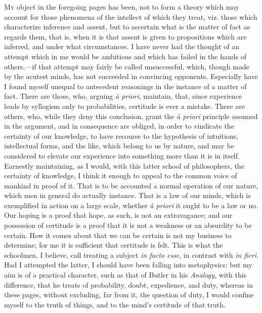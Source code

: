 M\textsc{y} object in the foregoing pages has been, not to form a
theory which may account for those phenomena of the intellect of which
they treat, viz. those which characterize inference and assent, but to
ascertain what is the matter of fact as regards them, that is, when it
is that assent is given to propositions which are inferred, and under
what circumstances. I have never had the thought of an attempt which
in me would be ambitious and which has failed in the hands of others,—if
that attempt may fairly be called unsuccessful, which, though made by
the acutest minds, has not succeeded in convincing opponents.
Especially have I found myself unequal to antecedent reasonings in the
instance of a matter of fact. There are those, who, arguing \emph{à
priori}, maintain, that, since experience leads by syllogism only
to probabilities, certitude is ever a mistake. There are others, who,
while they deny this conclusion, grant the \emph{à priori} principle
assumed in the argument, and in consequence are obliged, in order to
vindicate the certainty of our knowledge, to have recourse to the
hypothesis of intuitions, intellectual forms, and the like,
which belong to us by nature, and may be considered to elevate our
experience into something more than it is in itself. Earnestly
maintaining, as I would, with this latter school of philosophers, the
certainty of knowledge, I think it enough to appeal to the common
voice of mankind in proof of it. That is to be accounted a normal
operation of our nature, which men in general do actually instance.
That is a law of our minds, which is exemplified in action on a large
scale, whether \emph{à priori} it ought to be a law or no. Our hoping
is a proof that hope, as such, is not an extravagance; and our
possession of certitude is a proof that it is not a weakness or an
absurdity to be certain. How it comes about that we can be certain is
not my business to determine; for me it is sufficient that certitude
is felt. This is what the schoolmen, I believe, call treating a
subject \emph{in facto esse}, in contrast with \emph{in fieri}. Had I
attempted the latter, I should have been falling into metaphysics; but
my aim is of a practical character, such as that of Butler in his \emph{Analogy},
with this difference, that he treats of probability, doubt,
expedience, and duty, whereas in these pages, without excluding, far
from it, the question of duty, I would confine myself to the truth of
things, and to the mind's certitude of that truth.

